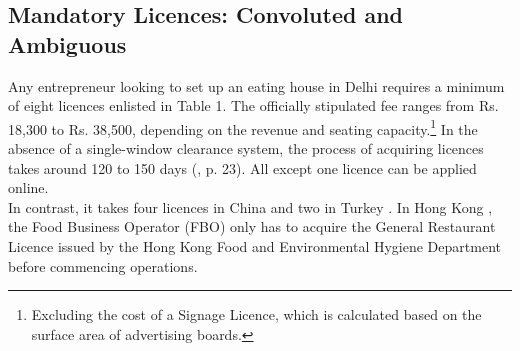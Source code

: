 \documentclass[a4paper, 12pt, twoside]{article}
\begin{document}
                    \subsection{Mandatory Licences: Convoluted and Ambiguous}
                     Any entrepreneur looking to set up an eating house in Delhi requires a minimum of eight licences enlisted in Table 1. The officially stipulated fee ranges from Rs. 18,300 to Rs. 38,500, depending on the revenue and seating capacity.\footnote{Excluding the cost of a Signage Licence, which is calculated based on the surface area of advertising boards.} In the absence of a single-window clearance system, the process of acquiring licences takes around 120 to 150 days (\cite{kpmg2016foodservindustry}, p. 23). All except one licence can be applied online. \\
     
                   In contrast, it takes four licences in China and two in Turkey \parencite{et2015fbooverregn}. In Hong Kong \parencite{guidemehk}, the Food Business Operator (FBO) only has to acquire the General Restaurant Licence issued by the Hong Kong Food and Environmental Hygiene Department before commencing operations.

 
\end{document}
